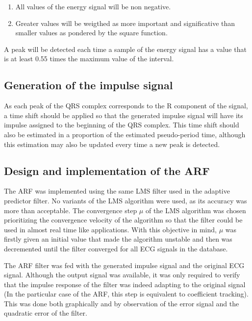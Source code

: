 \documentclass[conference]{IEEEtran}
\begin{document}
\begin{enumerate}
\item All values of the energy signal will be non negative.
\item Greater values will be weigthed as more important and significative than smaller values as pondered by the square function.
\end{enumerate}

A peak will be detected each time a sample of the energy signal has a value that is at least 0.55 times the maximum value of the interval.

\subsection{Generation of the impulse signal}

As each peak of the QRS complex corresponds to the R component of the signal, a time shift should be applied so that the generated impulse signal will have its impulse assigned to the beginning of the QRS complex. This time shift should also be estimated in a proportion of the estimated pseudo-period time, although this estimation may also be updated every time a new peak is detected.

\subsection{Design and implementation of the ARF}

The ARF was implemented using the same LMS filter used in the adaptive predictor filter. No variants of the LMS algorithm were used, as its accuracy was more than acceptable. The convergence step $\mu$ of the LMS algorithm was chosen prioritizing the convergence velocity of the algorithm so that the filter could be used in almost real time like applications. With this objective in mind, $\mu$ was firstly given an initial value that made the algorithm unstable and then was decremented until the filter converged for all ECG signals in the database. \par
The ARF filter was fed with the generated impulse signal and the original ECG signal. Although the output signal was available, it was only required to verify that the impulse response of the filter was indeed adapting to the original signal (In the particular case of the ARF, this step is equivalent to coefficient tracking). This was done both graphically and by observation of the error signal and the quadratic error of the filter.\par
\end{document}

